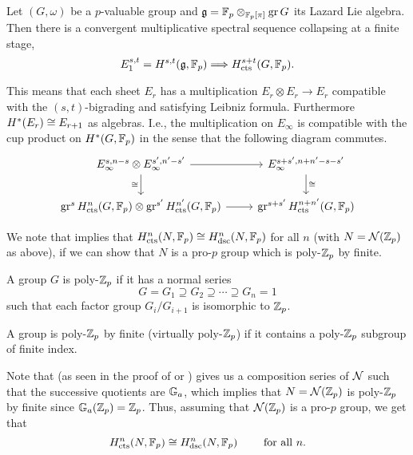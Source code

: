 \begin{theorem}\label{thm:spec-seq}
  Let $(G,\omega)$ be a $p$-valuable group and $\mathfrak{g} = \mathbb{F}_{p} \otimes_{\mathbb{F}_{p}[\pi]} \operatorname{gr} G$ its Lazard Lie algebra. Then there is a convergent multiplicative spectral sequence collapsing at a finite stage,
  \[
    E_1^{s,t} = H^{s,t}(\mathfrak{g},\mathbb{F}_{p}) \Longrightarrow H_{\mathrm{cts}}^{s+t}(G,\mathbb{F}_{p}).
  \]

  This means that each sheet $E_{r}$ has a multiplication $E_{r} \otimes E_{r} \to E_{r}$ compatible with the $(s,t)$-bigrading and satisfying Leibniz formula. Furthermore $H^{*}(E_{r}) \cong E_{r+1}$ as algebras. I.e., the multiplication on $E_\infty$ is compatible with the cup product on $H^{*}(G,\mathbb{F}_{p})$ in the sense that the following diagram commutes.
  \[
    \begin{tikzcd}
      E_\infty^{s,n-s} \otimes E_\infty^{s',n'-s'} \ar[r] \ar[d,swap,"\iso"] & E_\infty^{s+s',n+n'-s-s'} \ar[d,"\iso"] \\
      \gr^s \Hc^n(G,\F_{p}) \otimes \gr^{s'} \Hc^{n'}(G,\F_{p}) \ar[r] & \gr^{s+s'}\Hc^{n+n'}(G,\F_{p})
    \end{tikzcd}
  \]
\end{theorem}

\begin{remark}
  We note that \cite[Thm.~2.10]{CohComp} implies that $H_{\mathrm{cts}}^{n}(N,\mathbb{F}_{p}) \cong H_{\mathrm{dsc}}^{n}(N,\mathbb{F}_{p})$ for all $n$ (with $N = \mathcal{N}(\mathbb{Z}_{p})$ as above), if we can show that $N$ is a pro-$p$ group which is poly-$\mathbb{Z}_{p}$ by finite.
  \begin{definition}
    A group $G$ is poly-$\mathbb{Z}_{p}$ if it has a normal series
    \begin{equation*}
      G = G_{1} \supseteq G_{2} \supseteq \cdots  \supseteq G_{n} = 1
    \end{equation*}
    such that each factor group $G_{i}/G_{i+1}$ is isomorphic to $\mathbb{Z}_{p}$.

    A group is poly-$\mathbb{Z}_{p}$ by finite (virtually poly-$\mathbb{Z}_{p}$) if it contains a poly-$\mathbb{Z}_{p}$ subgroup of finite index.
  \end{definition}
  Note that \cite[Prop.~5.1.16(2) and Cor.~5.2.5]{Con-book} (as seen in the proof of \cite[Cor.~5.2.13]{Con-book} or \cite[Thm.~5.4.3]{Con-book}) gives us a composition series of $\mathcal{N}$ such that the successive quotients are $\mathbb{G}_{a}$, which implies that $N = \mathcal{N}(\mathbb{Z}_{p})$ is poly-$\mathbb{Z}_{p}$ by finite since $\mathbb{G}_{a}(\mathbb{Z}_{p}) = \mathbb{Z}_{p}$. Thus, assuming that $\mathcal{N}(\mathbb{Z}_{p})$ is a pro-$p$ group, we get that
  \begin{equation}
    \label{eq:coh-comp}
    H_{\mathrm{cts}}^{n}(N,\mathbb{F}_{p}) \cong H_{\mathrm{dsc}}^{n}(N,\mathbb{F}_{p}) \qquad \text{ for all } n.
  \end{equation}
\end{remark}

